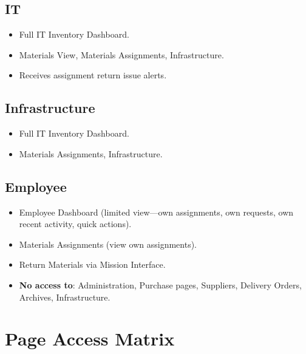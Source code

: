 \documentclass[11pt,a4paper]{article}
\begin{document}
\subsection{IT}
\begin{itemize}
  \item Full IT Inventory Dashboard.
  \item Materials View, Materials Assignments, Infrastructure.
  \item Receives assignment return issue alerts.
\end{itemize}

\subsection{Infrastructure}
\begin{itemize}
  \item Full IT Inventory Dashboard.
  \item Materials Assignments, Infrastructure.
\end{itemize}

\subsection{Employee}
\begin{itemize}
  \item Employee Dashboard (limited view---own assignments, own requests, own recent activity, quick actions).
  \item Materials Assignments (view own assignments).
  \item Return Materials via Mission Interface.
  \item \textbf{No access to}: Administration, Purchase pages, Suppliers, Delivery Orders, Archives, Infrastructure.
\end{itemize}

\section{Page Access Matrix}
\end{document}
